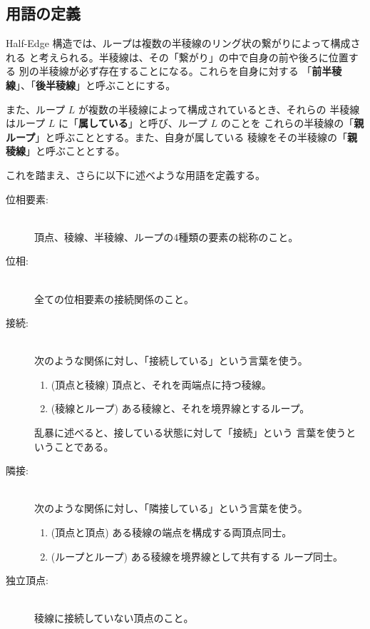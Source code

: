 \subsection{用語の定義}
Half-Edge 構造では、ループは複数の半稜線のリング状の繋がりによって構成される
と考えられる。半稜線は、その「繋がり」の中で自身の前や後ろに位置する
別の半稜線が必ず存在することになる。これらを自身に対する
「\textbf{前半稜線}」、「\textbf{後半稜線}」と呼ぶことにする。

また、ループ \(L\) が複数の半稜線によって構成されているとき、それらの
半稜線はループ \(L\) に「\textbf{属している}」と呼び、ループ \(L\) のことを
これらの半稜線の「\textbf{親ループ}」と呼ぶこととする。また、自身が属している
稜線をその半稜線の「\textbf{親稜線}」と呼ぶこととする。

これを踏まえ、さらに以下に述べような用語を定義する。
\begin{description}
 \item[位相要素:] ~ \\
	頂点、稜線、半稜線、ループの4種類の要素の総称のこと。

 \item[位相:] ~ \\
	全ての位相要素の接続関係のこと。

 \item[接続:] ~ \\
	次のような関係に対し、「接続している」という言葉を使う。
	\begin{enumerate}
	 \item (頂点と稜線) \quad 頂点と、それを両端点に持つ稜線。
	 \item (稜線とループ) \quad ある稜線と、それを境界線とするループ。
	\end{enumerate}
	乱暴に述べると、接している状態に対して「接続」という
	言葉を使うということである。

 \item[隣接:] ~ \\
	次のような関係に対し、「隣接している」という言葉を使う。
	\begin{enumerate}
	 \item (頂点と頂点) \quad ある稜線の端点を構成する両頂点同士。
	 \item (ループとループ) \quad ある稜線を境界線として共有する
		ループ同士。
	\end{enumerate}

 \item[独立頂点:] ~ \\
	稜線に接続していない頂点のこと。


\end{description}
